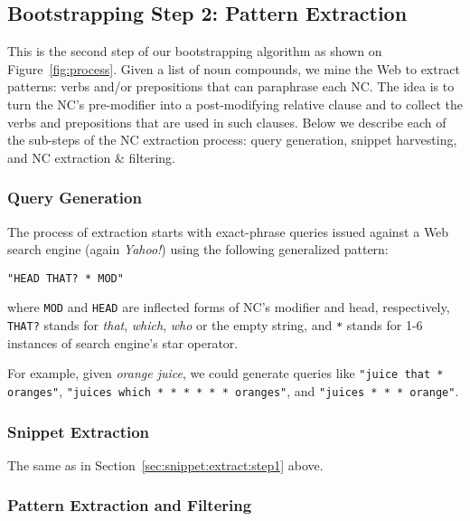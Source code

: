 \documentclass[letterpaper,11pt]{article}
\newcommand{\secref}[2][]{Section#1~\ref{#2}\xspace}
\newcommand{\figref}[2][]{Figure#1~\ref{#2}\xspace}
\begin{document}
\subsection{Bootstrapping Step 2: Pattern Extraction}
\label{sec:extraction-pattern}


This is  the second step  of our  bootstrapping algorithm as  shown on
\figref{fig:process}. Given a list of  noun compounds, we mine the Web
to  extract patterns:  verbs and/or  prepositions that  can paraphrase
each  NC.  The  idea is  to  turn the  NC's  pre-modifier into  a
post-modifying relative  clause and to  collect the verbs and prepositions
that  are used in such  clauses. Below we describe each of  the sub-steps of the
NC extraction  process: query  generation, snippet harvesting,  and NC
extraction \& filtering.

\subsubsection{Query Generation}

The  process of  extraction  starts with  exact-phrase queries  issued
against a Web search engine  (again \emph{Yahoo!}) using the following
generalized pattern:

\begin{center}
    \texttt{"HEAD THAT? * MOD"}
\end{center}

\noindent where \texttt{MOD} and  \texttt{HEAD} are inflected forms of
NC's  modifier  and  head,  respectively,  \texttt{THAT?}  stands  for
\emph{that},  \emph{which},  \emph{who}  or   the  empty  string,  and
\texttt{*} stands for 1-6 instances of search engine's star operator.

For example, given \emph{orange juice},
we could generate queries like
\texttt{"juice that * oranges"},
\texttt{"juices which * * * * * * oranges"},
and \texttt{"juices * * * orange"}.


\subsubsection{Snippet Extraction}

The same as in \secref{sec:snippet:extract:step1} above.


\subsubsection{Pattern Extraction and Filtering}
\label{sec:pattern:filtering}
\end{document}
